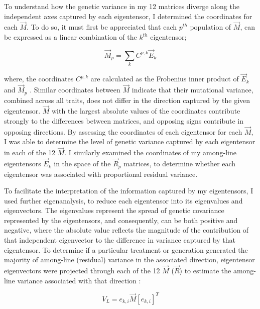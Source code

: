 To understand how the genetic variance in my 12 matrices diverge along the independent axes captured by each eigentensor, I determined the coordinates for each $\vec{M}$. To do so, it must first be appreciated that each $p^{th}$ population of $\vec{M}$, can be expressed as a linear combination of the  $k^{th}$ eigentensor;\par

\vspace{-\parskip}
\begin{equation}
\vec{M}_p= \sum_{k}C^{p,k}\vec{E}_k \label{eqn:multi_3_cord}
\end{equation}


\noindent where, the coordinates $C^{p,k}$ are calculated as the Frobenius inner product of $\vec{E}_k$ and $\vec{M}_p$ \citep{Hine09}. Similar coordinates between $\vec{M}$ indicate that their mutational variance, combined across all traits, does not differ in the direction captured by the given eigentensor. $\vec{M}$ with the largest absolute values of the coordinates contribute strongly to the differences between matrices, and opposing signs contribute in opposing directions. By assessing the coordinates of each eigentensor for each $\vec{M}$, I was able to determine the level of genetic variance captured by each eigentensor in each of the 12 $\vec{M}$. I similarly examined the coordinates of my among-line eigentensors $\vec{E}_k$ in the space of the $\vec{R}_p$ matrices, to determine whether each eigentensor was associated with proportional residual variance.\par

To facilitate the interpretation of the information captured by my eigentensors, I used further eigenanalysis, to reduce each eigentensor into its eigenvalues and eigenvectors. The eigenvalues represent the spread of genetic covariance represented by the eigentensors, and consequently, can be both positive and negative, where the absolute value reflects the magnitude of the contribution of that independent eigenvector to the difference in variance captured by that eigentensor. To determine if a particular treatment or generation generated the majority of among-line (residual) variance in the associated direction, eigentensor eigenvectors were projected through each of the 12 $\vec{M}$ ($\vec{R}$) to estimate the among-line variance associated with that direction \citep{Hine09}: 

\vspace{-\parskip}
\begin{equation}
V_L= e_{k,i}\vec{M}[e_{k,i}]^{T} \label{eqn:multi_4_vlprj}
\end{equation}

